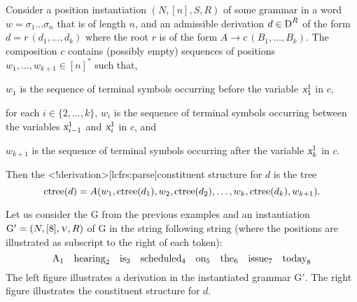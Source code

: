 \documentclass[../../document.tex]{subfiles}
\begin{document}
    \begin{definition}
        Consider a position instantiation \((N, [n], S, R)\) of some grammar in a word \(w = \sigma_1 \ldots \sigma_n\) that is of length \(n\), and an admissible derivation \(d \in \operatorname{D}^R\) of the form \(d = r\,(d_1, \ldots, d_k)\) where the root \(r\) is of the form \(A \to c\,(B_1, \ldots, B_k)\).
        The composition \(c\) contains (possibly empty) sequences of positions \(w_1, \ldots, w_{k+1} \in [n]^*\) such that,
        \begin{compactitem}
                \item \(w_1\) is the sequence of terminal symbols occurring before the variable \(\textsl{x}_1^1\) in \(c\),
                \item for each \(i \in \{2, \ldots, k\}\), \(w_i\) is the sequence of terminal symbols occurring between the variables \(\textsl{x}_{i-1}^1\) and \(\textsl{x}_i^1\) in \(c\), and
                \item \(w_{k+1}\) is the sequence of terminal symbols occurring after the variable \(\textsl{x}_k^1\) in \(c\).
            \end{compactitem}
        Then the <\lcfrs!derivation>[lcfrs:parse]{constituent structure} for \(d\) is the tree \[
            \operatorname{ctree}(d) = A(w_1, \operatorname{ctree}(d_1), w_2, \operatorname{ctree}(d_2), \ldots, w_k, \operatorname{ctree}(d_k), w_{k+1}) \text{.}
        \]
    \end{definition}

    \label{ex:lcfrs:instance}
    Let us consider the  \(\mathrm{G}\) from the previous examples and an instantiation \(\mathrm{G'} = (N, [8], \textsc{\textsl{v}}, R)\) of \(\mathrm{G}\) in the string following string (where the positions are illustrated as subscript to the right of each token): \[
        \text{A}_1 \quad \text{hearing}_2 \quad \text{is}_3 \quad \text{scheduled}_4 \quad \text{on}_5 \quad \text{the}_6 \quad \text{issue}_7 \quad \text{today}_8
    \]
    The left figure illustrates a derivation in the instantiated grammar \(\mathrm{G'}\).
    The right figure illustrates the constituent structure for \(d\).
\end{document}
